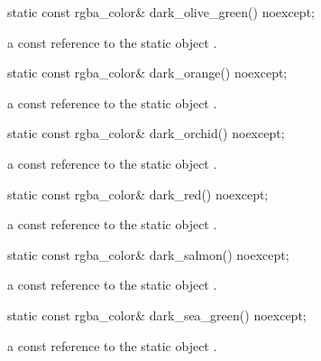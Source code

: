 \begin{itemdecl}
static const rgba_color& dark_olive_green() noexcept;
\end{itemdecl}
\begin{itemdescr}
\pnum
\returns
a const reference to the static  object .
\end{itemdescr}

\begin{itemdecl}
static const rgba_color& dark_orange() noexcept;
\end{itemdecl}
\begin{itemdescr}
\pnum
\returns
a const reference to the static  object .
\end{itemdescr}

\begin{itemdecl}
static const rgba_color& dark_orchid() noexcept;
\end{itemdecl}
\begin{itemdescr}
\pnum
\returns
a const reference to the static  object .
\end{itemdescr}

\begin{itemdecl}
static const rgba_color& dark_red() noexcept;
\end{itemdecl}
\begin{itemdescr}
\pnum
\returns
a const reference to the static  object .
\end{itemdescr}

\begin{itemdecl}
static const rgba_color& dark_salmon() noexcept;
\end{itemdecl}
\begin{itemdescr}
\pnum
\returns
a const reference to the static  object .
\end{itemdescr}

\begin{itemdecl}
static const rgba_color& dark_sea_green() noexcept;
\end{itemdecl}
\begin{itemdescr}
\pnum
\returns
a const reference to the static  object .
\end{itemdescr}

